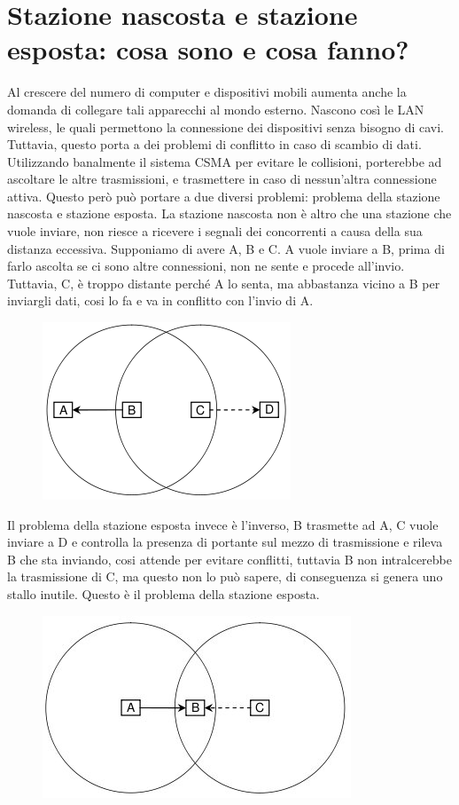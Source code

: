 \section{Stazione nascosta e stazione esposta: cosa sono e cosa fanno?}

Al crescere del numero di computer e dispositivi mobili aumenta anche la domanda di collegare tali apparecchi al mondo esterno.
Nascono così le LAN wireless, le quali permettono la connessione dei dispositivi senza bisogno di cavi.
Tuttavia, questo porta a dei problemi di conflitto in caso di scambio di dati.
Utilizzando banalmente il sistema CSMA per evitare le collisioni, porterebbe ad ascoltare le altre trasmissioni, e trasmettere in caso di nessun’altra connessione attiva.
Questo però può portare a due diversi problemi: problema della stazione nascosta e stazione esposta.
La stazione nascosta non è altro che una stazione che vuole inviare, non riesce a ricevere i segnali dei concorrenti a causa della sua distanza eccessiva. Supponiamo di avere A, B e C. A vuole inviare a B, prima di farlo ascolta se ci sono altre connessioni, non ne sente e procede all’invio. Tuttavia, C, è troppo distante perché A lo senta, ma abbastanza vicino a B per inviargli dati, cosi lo fa e va in conflitto con l’invio di A.

\begin{figure}[H]
\centering
\includegraphics[scale=0.6]{res/img/30_StazioneEsposta.png}
\end{figure} 
 
Il problema della stazione esposta invece è l’inverso, B trasmette ad A, C vuole inviare a D e controlla la presenza di portante sul mezzo di trasmissione e rileva B che sta inviando, cosi attende per evitare conflitti, tuttavia B non intralcerebbe la trasmissione di C, ma questo non lo può sapere, di conseguenza si genera uno stallo inutile. Questo è il problema della stazione esposta.
 
 \begin{figure}[H]
\centering
\includegraphics[scale=0.6]{res/img/30_StazioneNascosta.png}
\end{figure} 